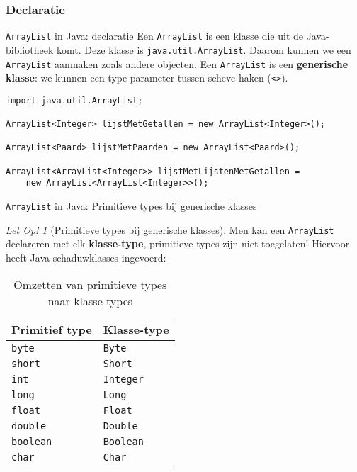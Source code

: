 \documentclass[handout]{beamer}
\theoremstyle{remark}
\newtheorem{letop}{Let Op!}
\newcommand{\term}[1]{\textbf{#1}}
\newcommand{\dsarraylist}{\texttt{ArrayList}}
\begin{document}
\subsubsection{Declaratie}
\begin{frame}[fragile]{\dsarraylist{} in Java: declaratie}
Een \dsarraylist{} is een klasse die uit de Java-bibliotheek komt. Deze klasse is \texttt{java.util.ArrayList}. Daarom kunnen we een \dsarraylist{} aanmaken zoals andere objecten. Een \dsarraylist{} is een \term{generische klasse}: we kunnen een type-parameter tussen scheve haken (\texttt{<>}).
\begin{example}[Declaratie \dsarraylist{}]
\begin{lstlisting}
import java.util.ArrayList;

ArrayList<Integer> lijstMetGetallen = new ArrayList<Integer>();

ArrayList<Paard> lijstMetPaarden = new ArrayList<Paard>();

ArrayList<ArrayList<Integer>> lijstMetLijstenMetGetallen =
    new ArrayList<ArrayList<Integer>>();
\end{lstlisting}
\end{example}
\end{frame}
\begin{frame}[fragile]{\dsarraylist{} in Java: Primitieve types bij generische klasses}
\begin{letop}[Primitieve types bij generische klasses]
\small{Men kan een \dsarraylist{} declareren met elk \term{klasse-type}, primitieve types zijn niet toegelaten! Hiervoor heeft Java schaduwklasses ingevoerd:}
\begin{table}
\centering
\small{\begin{tabular}{l|l}
Primitief type&Klasse-type\\\hline
\texttt{byte}&\texttt{Byte}\\
\texttt{short}&\texttt{Short}\\
\texttt{int}&\texttt{Integer}\\
\texttt{long}&\texttt{Long}\\
\texttt{float}&\texttt{Float}\\
\texttt{double}&\texttt{Double}\\
\texttt{boolean}&\texttt{Boolean}\\
\texttt{char}&\texttt{Char}\\
\end{tabular}}
\caption{Omzetten van primitieve types naar klasse-types}
\end{table}
\end{letop}
\end{frame}
\end{document}
